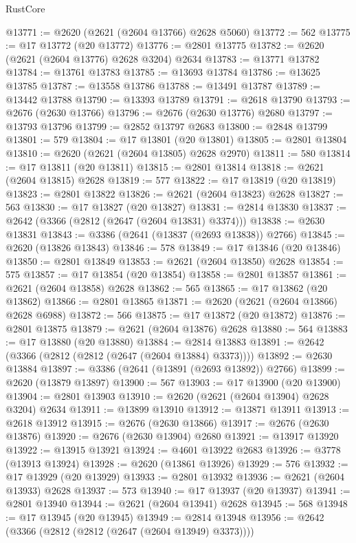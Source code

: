 \begin{lexlean}{RustCore}
\begin{coremodule}
@13771 := @2620 (@2621 (@2604 @13766) @2628 @5060)
@13772 := 562
@13775 := @17 @13772 (@20 @13772)
@13776 := @2801 @13775
@13782 := @2620 (@2621 (@2604 @13776) @2628 @3204) @2634
@13783 := @13771 @13782
@13784 := @13761 @13783
@13785 := @13693 @13784
@13786 := @13625 @13785
@13787 := @13558 @13786
@13788 := @13491 @13787
@13789 := @13442 @13788
@13790 := @13393 @13789
@13791 := @2618 @13790
@13793 := @2676 (@2630 @13766)
@13796 := @2676 (@2630 @13776) @2680
@13797 := @13793 @13796
@13799 := @2852 @13797 @2683
@13800 := @2848 @13799
@13801 := 579
@13804 := @17 @13801 (@20 @13801)
@13805 := @2801 @13804
@13810 := @2620 (@2621 (@2604 @13805) @2628 @2970)
@13811 := 580
@13814 := @17 @13811 (@20 @13811)
@13815 := @2801 @13814
@13818 := @2621 (@2604 @13815) @2628
@13819 := 577
@13822 := @17 @13819 (@20 @13819)
@13823 := @2801 @13822
@13826 := @2621 (@2604 @13823) @2628
@13827 := 563
@13830 := @17 @13827 (@20 @13827)
@13831 := @2814 @13830
@13837 := @2642 (@3366 (@2812 (@2647 (@2604 @13831) @3374)))
@13838 := @2630 @13831
@13843 := @3386 (@2641 (@13837 (@2693 @13838)) @2766)
@13845 := @2620 (@13826 @13843)
@13846 := 578
@13849 := @17 @13846 (@20 @13846)
@13850 := @2801 @13849
@13853 := @2621 (@2604 @13850) @2628
@13854 := 575
@13857 := @17 @13854 (@20 @13854)
@13858 := @2801 @13857
@13861 := @2621 (@2604 @13858) @2628
@13862 := 565
@13865 := @17 @13862 (@20 @13862)
@13866 := @2801 @13865
@13871 := @2620 (@2621 (@2604 @13866) @2628 @6988)
@13872 := 566
@13875 := @17 @13872 (@20 @13872)
@13876 := @2801 @13875
@13879 := @2621 (@2604 @13876) @2628
@13880 := 564
@13883 := @17 @13880 (@20 @13880)
@13884 := @2814 @13883
@13891 := @2642 (@3366 (@2812 (@2812 (@2647 (@2604 @13884) @3373))))
@13892 := @2630 @13884
@13897 := @3386 (@2641 (@13891 (@2693 @13892)) @2766)
@13899 := @2620 (@13879 @13897)
@13900 := 567
@13903 := @17 @13900 (@20 @13900)
@13904 := @2801 @13903
@13910 := @2620 (@2621 (@2604 @13904) @2628 @3204) @2634
@13911 := @13899 @13910
@13912 := @13871 @13911
@13913 := @2618 @13912
@13915 := @2676 (@2630 @13866)
@13917 := @2676 (@2630 @13876)
@13920 := @2676 (@2630 @13904) @2680
@13921 := @13917 @13920
@13922 := @13915 @13921
@13924 := @4601 @13922 @2683
@13926 := @3778 (@13913 @13924)
@13928 := @2620 (@13861 @13926)
@13929 := 576
@13932 := @17 @13929 (@20 @13929)
@13933 := @2801 @13932
@13936 := @2621 (@2604 @13933) @2628
@13937 := 573
@13940 := @17 @13937 (@20 @13937)
@13941 := @2801 @13940
@13944 := @2621 (@2604 @13941) @2628
@13945 := 568
@13948 := @17 @13945 (@20 @13945)
@13949 := @2814 @13948
@13956 := @2642 (@3366 (@2812 (@2812 (@2647 (@2604 @13949) @3373))))

\end{coremodule}
\end{lexlean}
